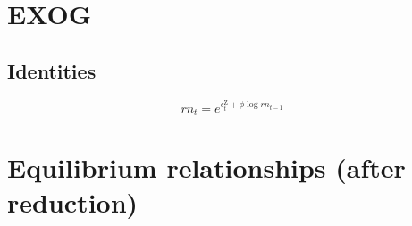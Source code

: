 \section{EXOG}

\subsection{Identities}

\begin{equation}
{r\!n}_{t} = e^{\epsilon^{\mathrm{Z}}_{t} + {\phi} {\log{{r\!n}_{t-1}}}}
\end{equation}




\section{Equilibrium relationships (after reduction)}

